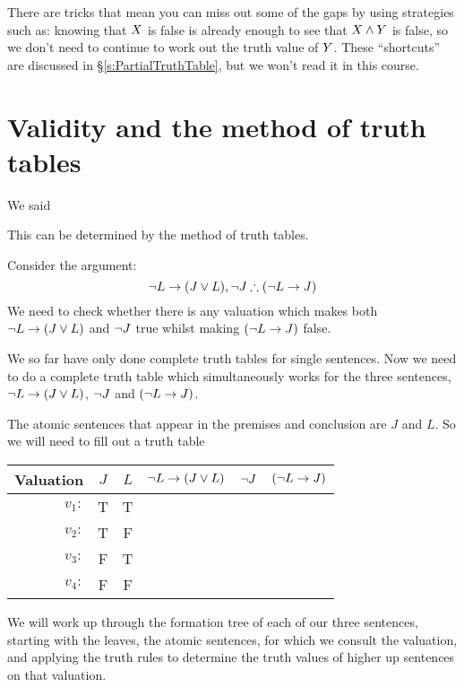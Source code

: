 There are tricks that mean you can miss out some of the gaps by using strategies such as: knowing that $X$ is false is already enough to see that $X\mathbin{\wedge}Y$ is false, so we don't need to continue to work out the truth value of $Y$. These ``shortcuts'' are discussed in \S\ref{s:PartialTruthTable}, but we won't read it in this course.




\section{Validity and the method of truth tables}
We said




This can be determined by the method of truth tables.

Consider the argument:
$$\enot L \eif (J \eor L),\enot J\therefore (\enot L\eif J)$$
We need to check whether there is any valuation which makes both $\neg L \rightarrow (J \vee L)$ and $\neg J$ true whilst making $(\neg L\rightarrow J) $ false. 

We so far have only done complete truth tables for single sentences. Now we need to do a complete truth table which simultaneously works for the three sentences, $\neg L \rightarrow (J \vee L)$, $\neg J$ and $(\neg L\rightarrow J)$.


The atomic sentences that appear in the premises and conclusion are $J$ and $L$. So we will need to fill out a truth table

\begin{center}
	\begin{tabular}{rcc|c|c|c}
		Valuation&$J$&$L$&$\neg L \rightarrow (J \vee L)$&$\neg J$ & $(\neg L\rightarrow J)$\\\hline
		$v_1:$&T&T&&&\\
		$v_2:$&T&F&&&\\
		$v_3:$&F&T&&&\\
		$v_4:$&F&F&&
	\end{tabular}
\end{center}

We will work up through the formation tree of each of our three sentences, starting with the leaves, the atomic sentences, for which we consult the valuation, and applying the truth rules to determine the truth values of higher up sentences on that valuation. 


